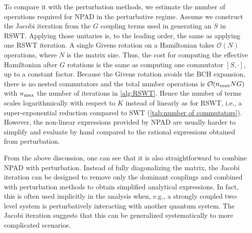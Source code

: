 \documentclass[%
 reprint,
 amsmath,amssymb,
 aps,
pra,
noeprint,
superscriptaddress,
]{revtex4-2}
\begin{document}
To compare it with the perturbation methods, we estimate the number of operations required for NPAD in the perturbative regime.
Assume we construct the Jacobi iteration from the $G$ coupling terms used in generating an $S$ in RSWT.
Applying those unitaries is, to the leading order, the same as applying one RSWT iteration.
A single Givens rotation on a Hamiltonian takes $\mathcal{O}(N)$ operations, where $N$ is the matrix size.
Thus, the cost for computing the effective Hamiltonian after $G$ rotations is the same as computing one commutator $[S,\boldsymbol{\cdot}]$, up to a constant factor.
Because the Givens rotation avoids the BCH expansion, there is no nested commutators and the total number operations is $\mathcal{O}(n_{\rm{max}}NG)$  with $n_{\rm{max}}$ the number of iterations in \cref{alg:RSWT}.
Hence the number of terms scales logarithmically with respect to $K$ instead of linearly as for RSWT, i.e., a super-exponential reduction compared to SWT (\cref{tab:number of commutators}).
However, the non-linear expressions provided by NPAD are usually harder to simplify and evaluate by hand compared to the rational expressions obtained from perturbation.

From the above discussion, one can see that it is also straightforward to combine NPAD with perturbation.
Instead of fully diagonalizing the matrix, the Jacobi iteration can be designed to remove only the dominant couplings and combined with perturbation methods to obtain simplified analytical expressions.
In fact, this is often used implicitly in the analysis when, e.g., a strongly coupled two-level system is perturbatively interacting with another quantum system.
The Jacobi iteration suggests that this can be generalized systematically to more complicated scenarios.
\end{document}
